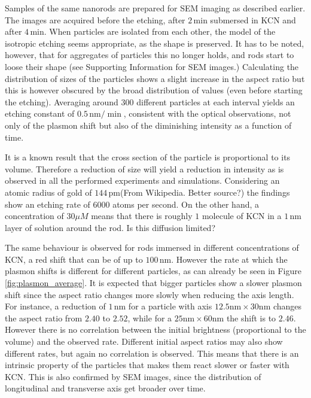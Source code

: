 \documentclass{article}
\begin{document}
Samples of the same nanorods are prepared for SEM imaging as described earlier.
The images are acquired before the etching, after $2\,\textrm{min}$ submersed in
KCN and after $4\,\textrm{min}$. When particles are isolated from each other,
the model of the isotropic etching seems appropriate, as the shape is preserved.
It has to be noted, however, that for aggregates of particles this no longer
holds, and rods start to loose their shape (see Supporting Information for SEM
images.) Calculating the distribution of sizes of the particles shows a slight
increase in the aspect ratio but this is however obscured by the broad
distribution of values (even before starting the etching). Averaging around
$300$ different particles at each interval yields an etching constant of
$0.5\,\textrm{nm}/\min$, consistent with the optical observations, not only of
the plasmon shift but also of the diminishing intensity as a function of time. 

It is a known result that the cross section of the particle is proportional to
its volume. Therefore a reduction of size will yield a reduction in intensity
as is observed in all the performed experiments and simulations. Considering an
atomic radius of gold of $144\,\textrm{pm}$(From Wikipedia. Better source?) the
findings show an etching rate of $6000$ atoms per second. On the other hand, a
concentration of $30\mu M$ means that there is roughly $1$ molecule of KCN in a
$1\,\textrm{nm}$ layer of solution around the rod. Is this diffusion limited? 

The same behaviour is observed for rods immersed in different concentrations of
KCN, a red shift that can be of up to $100\,\textrm{nm}$. However the rate at
which the plasmon shifts is different for different particles, as can already be
seen in Figure \ref{fig:plasmon_average}. It is expected that bigger particles
show a slower plasmon shift since the aspect ratio changes more slowly when
reducing the axis length. For instance, a reduction of $1\,\textrm{nm}$ for a
particle with axis $12.5\textrm{nm}\times30\textrm{nm}$ changes the aspect ratio
from  $2.40$ to $2.52$, while for a $25\textrm{nm}\times60\textrm{nm}$ the shift
is to $2.46$. However there is no correlation between the initial brightness
(proportional to the volume) and the observed rate. Different initial aspect
ratios may also show different rates, but again no correlation is observed. This
means that there is an intrinsic property of the particles that makes them react
slower or faster with KCN. This is also confirmed by SEM images, since the
distribution of longitudinal and transverse axis get broader over time.
\end{document}

